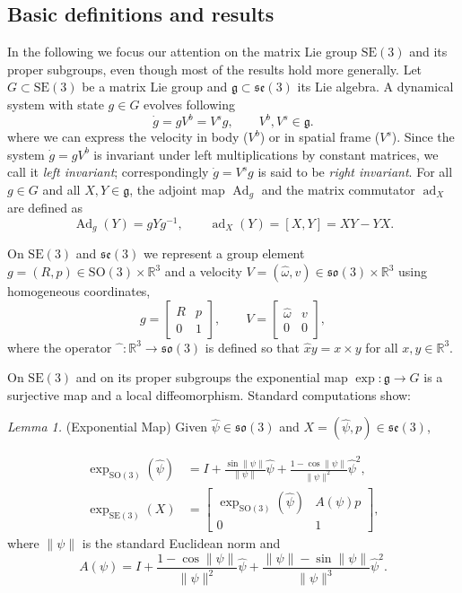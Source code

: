 \documentclass[10pt,twocolumn]{article}
\newcommand{\SO}{\mathrm{SO}}
\newcommand{\SE}{\mathrm{SE}}
\newcommand{\so}{\mathfrak{so}}
\newcommand{\se}{\mathfrak{se}}
\newcommand{\gfrak}{\mathfrak g}
\newcommand{\Ad}{\operatorname{Ad}}
\newcommand{\ad}{\operatorname{ad}}
\newcommand{\R}{\mathbb R}
\newcounter{paperitem}
\newcommand{\paperhead}[3]{\refstepcounter{paperitem}\par\medskip\noindent\textit{#1}\label{#3} #2\par}
\begin{document}
\subsection{Basic definitions and results}\label{subsec:basic-definitions}
In the following we focus our attention on the matrix Lie group $\SE(3)$ and its proper subgroups, even though most of the results hold more generally. Let $G\subset\SE(3)$ be a matrix Lie group and $\gfrak\subset\se(3)$ its Lie algebra. A dynamical system with state $g\in G$ evolves following
\begin{equation*}
\dot g=gV^b=V^s g,\qquad V^b,V^s\in\gfrak.\tag{1}\label{eq:1}
\end{equation*}
where we can express the velocity in body ($V^b$) or in spatial frame ($V^s$). Since the system $\dot g=gV^b$ is invariant under left multiplications by constant matrices, we call it \emph{left invariant}; correspondingly $\dot g=V^s g$ is said to be \emph{right invariant}. For all $g\in G$ and all $X,Y\in\gfrak$, the adjoint map $\Ad_g$ and the matrix commutator $\ad_X$ are defined as
\begin{equation*}
\Ad_g(Y)=gYg^{-1},
\qquad
\ad_X(Y)=[X,Y]=XY-YX.
\end{equation*}

On $\SE(3)$ and $\se(3)$ we represent a group element $g=(R,p)\in\SO(3)\times\R^3$ and a velocity $V=(\widehat\omega,v)\in\so(3)\times\R^3$ using homogeneous coordinates,
\begin{equation*}
g=\begin{bmatrix}R&p\\0&1\end{bmatrix},
\qquad
V=\begin{bmatrix}\widehat\omega&v\\0&0\end{bmatrix},
\end{equation*}
where the operator $\widehat{\phantom{x}}:\R^3\to\so(3)$ is defined so that $\widehat{x}y=x\times y$ for all $x,y\in\R^3$.

On $\SE(3)$ and on its proper subgroups the exponential map $\exp:\gfrak\to G$ is a surjective map and a local diffeomorphism. Standard computations show:

\paperhead{Lemma 1.}{(Exponential Map) Given $\widehat\psi\in\so(3)$ and $X=(\widehat\psi,p)\in\se(3)$,}{lem:exp-map}
\begin{align*}
\exp_{\SO(3)}(\widehat\psi)
&=I+\frac{\sin\|\psi\|}{\|\psi\|}\widehat\psi
+\frac{1-\cos\|\psi\|}{\|\psi\|^2}\widehat\psi^2,\\[0.4em]
\exp_{\SE(3)}(X)
&=\begin{bmatrix}
\exp_{\SO(3)}(\widehat\psi)&A(\psi)p\\
0&1
\end{bmatrix},
\end{align*}
where $\|\psi\|$ is the standard Euclidean norm and
\begin{equation*}
A(\psi)=I+\frac{1-\cos\|\psi\|}{\|\psi\|^2}\widehat\psi
+\frac{\|\psi\|-\sin\|\psi\|}{\|\psi\|^3}\widehat\psi^2.
\end{equation*}
\end{document}
